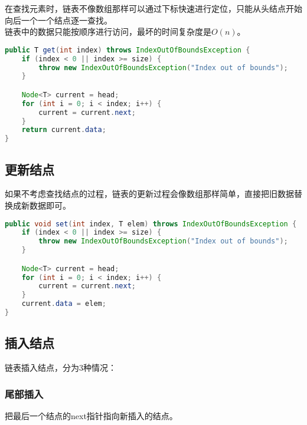 在查找元素时，链表不像数组那样可以通过下标快速进行定位，只能从头结点开始向后一个一个结点逐一查找。\\

链表中的数据只能按顺序进行访问，最坏的时间复杂度是$ O(n) $。\\


\begin{lstlisting}[language=Java]
public T get(int index) throws IndexOutOfBoundsException {
	if (index < 0 || index >= size) {
		throw new IndexOutOfBoundsException("Index out of bounds");
	}

	Node<T> current = head;
	for (int i = 0; i < index; i++) {
		current = current.next;
	}
	return current.data;
}
\end{lstlisting}

\vspace{0.5cm}

\subsection{更新结点}

如果不考虑查找结点的过程，链表的更新过程会像数组那样简单，直接把旧数据替换成新数据即可。\\


\begin{lstlisting}[language=Java]
public void set(int index, T elem) throws IndexOutOfBoundsException {
	if (index < 0 || index >= size) {
		throw new IndexOutOfBoundsException("Index out of bounds");
	}

	Node<T> current = head;
	for (int i = 0; i < index; i++) {
		current = current.next;
	}
	current.data = elem;
}
\end{lstlisting}

\vspace{0.5cm}

\subsection{插入结点}

链表插入结点，分为3种情况：

\subsubsection{尾部插入}

把最后一个结点的next指针指向新插入的结点。


